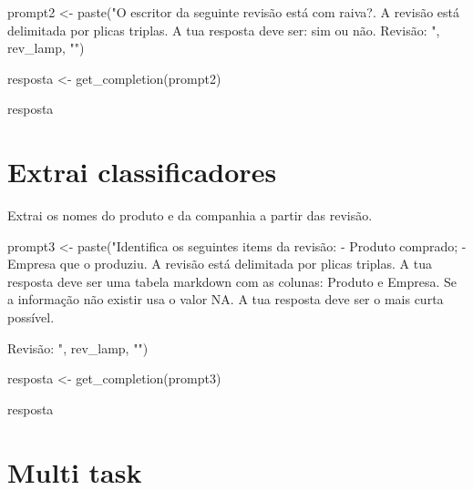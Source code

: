 \documentclass[
  letterpaper,
  paper=6in:9in,
  pagesize=pdftex,
  headinclude=on,
  footinclude=on,
  12pt]{scrbook}
\newenvironment{Shaded}{\begin{snugshade}}{\end{snugshade}}
\newcommand{\FunctionTok}[1]{\textcolor[rgb]{0.28,0.35,0.67}{#1}}
\newcommand{\NormalTok}[1]{\textcolor[rgb]{0.00,0.23,0.31}{#1}}
\newcommand{\OtherTok}[1]{\textcolor[rgb]{0.00,0.23,0.31}{#1}}
\newcommand{\StringTok}[1]{\textcolor[rgb]{0.13,0.47,0.30}{#1}}
\begin{document}
\begin{Shaded}
\begin{Highlighting}[]
\NormalTok{prompt2 }\OtherTok{\textless{}{-}} \FunctionTok{paste}\NormalTok{(}\StringTok{"O escritor da seguinte revisão está com raiva?. }
\StringTok{A  revisão está delimitada por plicas triplas. A tua resposta deve ser: sim ou não.}
\StringTok{                 Revisão: \textquotesingle{}\textquotesingle{}\textquotesingle{} "}\NormalTok{, rev\_lamp, }\StringTok{"\textquotesingle{}\textquotesingle{}\textquotesingle{}"}\NormalTok{)}

\NormalTok{resposta }\OtherTok{\textless{}{-}} \FunctionTok{get\_completion}\NormalTok{(prompt2)}

\NormalTok{resposta}
\end{Highlighting}
\end{Shaded}

\hypertarget{extrai-classificadores}{%
\section{Extrai classificadores}\label{extrai-classificadores}}

Extrai os nomes do produto e da companhia a partir das revisão.

\begin{Shaded}
\begin{Highlighting}[]
\NormalTok{prompt3 }\OtherTok{\textless{}{-}} \FunctionTok{paste}\NormalTok{(}\StringTok{"Identifica os seguintes items da revisão:}
\StringTok{{-} Produto comprado;}
\StringTok{{-} Empresa que o produziu. }
\StringTok{A  revisão está delimitada por plicas triplas. }
\StringTok{A tua resposta deve ser uma tabela markdown com as colunas: Produto e Empresa.}
\StringTok{Se a informação não existir usa o valor NA. A tua resposta deve ser o mais curta possível.}

\StringTok{                 Revisão: \textquotesingle{}\textquotesingle{}\textquotesingle{} "}\NormalTok{, rev\_lamp, }\StringTok{"\textquotesingle{}\textquotesingle{}\textquotesingle{}"}\NormalTok{)}

\NormalTok{resposta }\OtherTok{\textless{}{-}} \FunctionTok{get\_completion}\NormalTok{(prompt3)}

\NormalTok{resposta}
\end{Highlighting}
\end{Shaded}

\hypertarget{multi-task}{%
\section{Multi task}\label{multi-task}}
\end{document}
